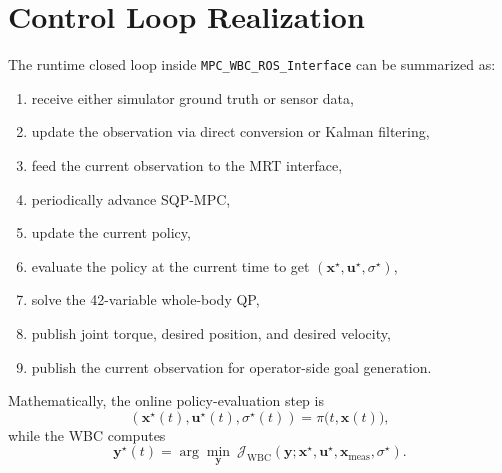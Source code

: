 \documentclass[11pt,a4paper]{article}
\newcommand{\vect}[1]{\bm{#1}}
\newcommand{\code}[1]{\texttt{#1}}
\begin{document}
\section{Control Loop Realization}
The runtime closed loop inside \code{MPC\_WBC\_ROS\_Interface} can be summarized as:
\begin{enumerate}[leftmargin=*]
\item receive either simulator ground truth or sensor data,
\item update the observation via direct conversion or Kalman filtering,
\item feed the current observation to the MRT interface,
\item periodically advance SQP-MPC,
\item update the current policy,
\item evaluate the policy at the current time to get \((\vect{x}^{\star}, \vect{u}^{\star}, \sigma^\star)\),
\item solve the 42-variable whole-body QP,
\item publish joint torque, desired position, and desired velocity,
\item publish the current observation for operator-side goal generation.
\end{enumerate}

Mathematically, the online policy-evaluation step is
\begin{equation}
(\vect{x}^{\star}(t), \vect{u}^{\star}(t), \sigma^\star(t))
= \pi\big(t,\vect{x}(t)\big),
\end{equation}
while the WBC computes
\begin{equation}
\vect{y}^{\star}(t) =
\arg\min_{\vect{y}} \ \mathcal{J}_{\mathrm{WBC}}(\vect{y}; \vect{x}^{\star},\vect{u}^{\star},\vect{x}_{\mathrm{meas}},\sigma^\star).
\end{equation}
\end{document}
